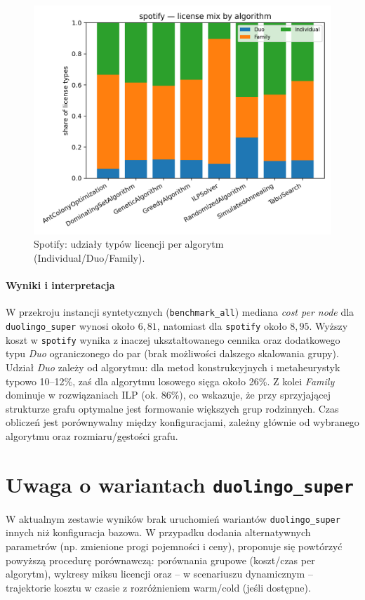 \begin{figure}[H]
  \centering
  \includegraphics[width=0.75\linewidth]{assets/figures/extensions/spotify_license_mix.png}
\caption{Spotify: udziały typów licencji per algorytm (Individual/Duo/Family).}
  \label{fig:spotify_mix}
\end{figure}

\paragraph{Wyniki i interpretacja}
W przekroju instancji syntetycznych (\texttt{benchmark\_all}) mediana \textit{cost per node} dla \texttt{duolingo\_super} wynosi około $6{,}81$, natomiast dla \texttt{spotify} około $8{,}95$. Wyższy koszt w \texttt{spotify} wynika z inaczej ukształtowanego cennika oraz dodatkowego typu \emph{Duo} ograniczonego do par (brak możliwości dalszego skalowania grupy). Udział \emph{Duo} zależy od algorytmu: dla metod konstrukcyjnych i metaheurystyk typowo 10–12\%, zaś dla algorytmu losowego sięga około 26\%. Z kolei \emph{Family} dominuje w rozwiązaniach ILP (ok. 86\%), co wskazuje, że przy sprzyjającej strukturze grafu optymalne jest formowanie większych grup rodzinnych. Czas obliczeń jest porównywalny między konfiguracjami, zależny głównie od wybranego algorytmu oraz rozmiaru/gęstości grafu.

\section{Uwaga o wariantach \texttt{duolingo\_super}}

W aktualnym zestawie wyników brak uruchomień wariantów \texttt{duolingo\_super} innych niż konfiguracja bazowa. W przypadku dodania alternatywnych parametrów (np. zmienione progi pojemności i ceny), proponuje się powtórzyć powyższą procedurę porównawczą: porównania grupowe (koszt/czas per algorytm), wykresy miksu licencji oraz – w scenariuszu dynamicznym – trajektorie kosztu w czasie z rozróżnieniem warm/cold (jeśli dostępne).

